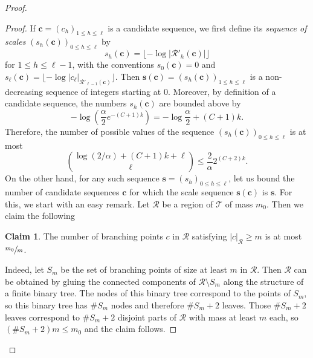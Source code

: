 \documentclass[11pt]{article}
\let\backslash\setminus
\newcommand{\Rr}{\mathcal{R}}
\theoremstyle{plain}
\theoremstyle{definition}
\newtheorem*{claim*}{Claim}
\numberwithin{equation}{section}
\begin{document}
\begin{proof}
\begin{proof}
If $\mathbf{c}=(c_h)_{1 \leq h \leq \ell}$ is a candidate sequence, we first define its \emph{sequence of scales} $\left( s_h(\mathbf{c}) \right)_{0 \leq h \leq \ell}$ by
\[ s_h(\mathbf{c}) = \lfloor -\log \left| \Rr'_h(\mathbf{c}) \right| \rfloor \]
for $1 \leq h \leq \ell-1$, with the conventions $s_0(\mathbf{c})=0$ and $s_{\ell}(\mathbf{c})=\lfloor -\log |c_{\ell}|_{\Rr'_{\ell-1}(\mathbf{c})} \rfloor$.
Then $\mathbf{s}(\mathbf{c})=\left( s_h(\mathbf{c}) \right)_{1 \leq h \leq \ell}$ is a non-decreasing sequence of integers starting at $0$.
Moreover, by definition of a candidate sequence, the numbers $s_h(\mathbf{c})$ are bounded above by
\[ -\log \left( \frac{\alpha}{2} e^{-(C+1)k}\right) = -\log \frac{\alpha}{2} + (C+1) k.\]
Therefore, the number of possible values of the sequence $\left( s_h(\mathbf{c}) \right)_{0 \leq h \leq \ell}$ is at most
\begin{equation}\label{eqn_number_scale_sequences}
\binom{\log (2/\alpha) + (C+1)k + \ell}{\ell} \leq \frac{2}{\alpha} 2^{(C+2)k}.
\end{equation}
On the other hand, for any such sequence $\mathbf{s}=(s_h)_{0 \leq h \leq \ell}$, let us bound the number of candidate sequences $\mathbf{c}$ for which the scale sequence $\mathbf{s}(\mathbf{c})$ is $\mathbf{s}$.
For this, we start with an easy remark.
Let $\Rr$ be a region of $\mathcal{T}$ of mass $m_0$.
Then we claim the following
\begin{claim*}
The number of branching points $c$ in $\Rr$ satisfying $|c|_{\Rr} \geq m$ is at most $\sfrac{m_0}{m}$.
\end{claim*}
Indeed, let $S_m$ be the set of branching points of size at least $m$ in $\Rr$.
Then $\Rr$ can be obtained by gluing the connected components of $\Rr \backslash S_m$ along the structure of a finite binary tree.
The nodes of this binary tree correspond to the points of $S_m$, so this binary tree has $\# S_m$ nodes and therefore $\# S_m+2$ leaves.
Those $\# S_m+2$ leaves correspond to $\# S_m+2$ disjoint parts of $\Rr$ with mass at least $m$ each, so $\left( \# S_m+2 \right) m \leq m_0$ and the claim follows.


\end{proof}
\end{proof}
\end{document}
